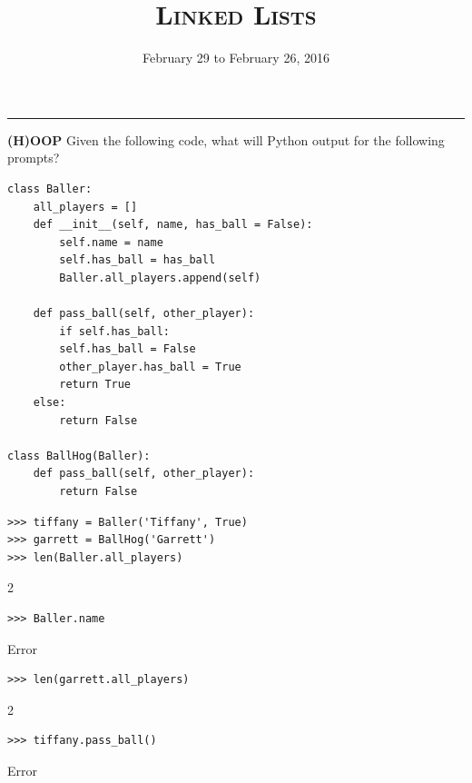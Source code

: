 \documentclass{exam}
\title{\textsc{Linked Lists}}
\date{February 29 to February 26, 2016}
\begin{document}
\maketitle
\rule{\textwidth}{0.15em}
\fontsize{12}{15}\selectfont




\begin{questions}
\begin{blocksection}
\question \textbf{(H)OOP} \newline
Given the following code, what will Python output for the following prompts? 

\begin{lstlisting}
class Baller:
	all_players = []
	def __init__(self, name, has_ball = False):
		self.name = name
		self.has_ball = has_ball
		Baller.all_players.append(self)
	
	def pass_ball(self, other_player):
		if self.has_ball:
		self.has_ball = False
		other_player.has_ball = True
		return True
	else:
		return False

class BallHog(Baller):
	def pass_ball(self, other_player):	
		return False	
\end{lstlisting}

\begin{lstlisting}
>>> tiffany = Baller('Tiffany', True)
>>> garrett = BallHog('Garrett')
>>> len(Baller.all_players)
\end{lstlisting}
\begin{solution}[.2in]
2
\end{solution}

\begin{lstlisting}
>>> Baller.name
\end{lstlisting}
\begin{solution}[.2in]
Error
\end{solution}

\begin{lstlisting}
>>> len(garrett.all_players)
\end{lstlisting}
\begin{solution}[.2in]
2
\end{solution}
\end{blocksection}

\begin{blocksection}
\begin{lstlisting}
>>> tiffany.pass_ball()
\end{lstlisting}
\begin{solution}[.2in]
Error
\end{solution}


\end{blocksection}
\end{questions}
\end{document}
